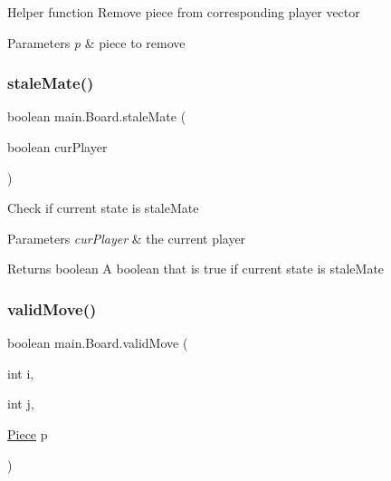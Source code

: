 Helper function Remove piece from corresponding player vector


\begin{DoxyParams}{Parameters}
{\em p} & piece to remove \\
\hline
\end{DoxyParams}
\mbox{\label{classmain_1_1_board_a907a1f26384edaa20589e7f58f903bf7}} 
\subsubsection{\texorpdfstring{staleMate()}{staleMate()}}
{\footnotesize\ttfamily boolean main.\+Board.\+stale\+Mate (\begin{DoxyParamCaption}\item[{boolean}]{cur\+Player }\end{DoxyParamCaption})\hspace{0.3cm}{\ttfamily [inline]}}

Check if current state is stale\+Mate


\begin{DoxyParams}{Parameters}
{\em cur\+Player} & the current player \\
\hline
\end{DoxyParams}
\begin{DoxyReturn}{Returns}
boolean A boolean that is true if current state is stale\+Mate 
\end{DoxyReturn}
\mbox{\label{classmain_1_1_board_ab7743e041d844346979698189dfa4299}} 
\subsubsection{\texorpdfstring{validMove()}{validMove()}}
{\footnotesize\ttfamily boolean main.\+Board.\+valid\+Move (\begin{DoxyParamCaption}\item[{int}]{i,  }\item[{int}]{j,  }\item[{\mbox{\hyperlink{classmain_1_1_piece}{Piece}}}]{p }\end{DoxyParamCaption})\hspace{0.3cm}{\ttfamily [inline]}}

